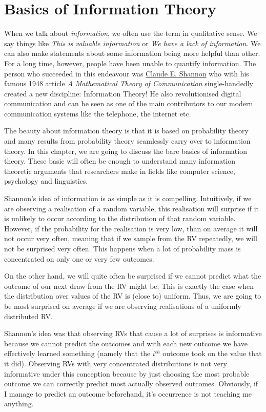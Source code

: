 \section{Basics of Information Theory}

When we talk about \textit{information}, we often use the term in qualitative sense. We say things like 
\textit{This is valuable information} or 
\textit{We have a lack of information}. We can also make statements about some information being more helpful than other. For a long time, however,
people have been unable to quantify information. The person who succeeded in this endeavour was \href{https://en.wikipedia.org/wiki/Claude_Shannon}{Claude E. Shannon}
who with his famous 1948 article \textit{A Mathematical Theory of Communication} single-handedly created a new discipline: Information Theory! He also revolutionised
digital communication and can be seen as one of the main contributors to our modern communication systems like the telephone, the internet etc. 

The beauty about information theory is that it is based on probability theory and many results from probability theory seamlessly carry over to information theory.
In this chapter, we are going to discuss the bare basics of information theory. These basic will often be enough to understand many information theoretic arguments
that researchers make in fields like computer science, psychology and linguistics.

Shannon's idea of information is as simple as it is compelling. Intuitively, if we are observing a realisation of a random variable, this realisation will surprise
if it is unlikely to occur according to the distribution of that random variable. However, if the probability for the realisation is very low, than on average it
will not occur very often, meaning that if we sample from the RV repeatedly, we will not be surprised very often. This happens when a lot of probability mass
is concentrated on only one or very few outcomes.

On the other hand, we will quite often be surprised
if we cannot predict what the outcome of our next draw from the RV might be. This is exactly the case when the distribution over values of the RV is (close to) uniform. 
Thus, we are going to be most surprised on average if we are observing realisations of a uniformly distributed RV.

Shannon's idea was that observing RVs that cause a lot of surprises is informative because we cannot predict the outcomes and with each new outcome we have effectively
learned something  (namely that the $ i^{th} $ outcome took on the value that it did). Observing RVs with very concentrated distributions is not very informative
under this conception because by just choosing the most probable outcome we can correctly predict most actually observed outcomes. Obviously, if I manage to predict
an outcome beforehand, it's occurrence is not teaching me anything.

